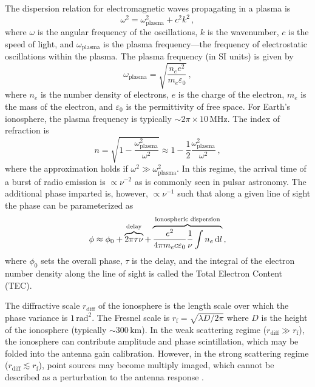 \begin{bibunit}
The dispersion relation for electromagnetic waves propagating in a plasma is
\begin{equation}
    \omega^2 = \omega_\text{plasma}^2 + c^2 k^2\,,
\end{equation}
where $\omega$ is the angular frequency of the oscillations, $k$ is the wavenumber, $c$ is the speed
of light, and $\omega_\text{plasma}$ is the plasma frequency---the frequency of electrostatic
oscillations within the plasma. The plasma frequency (in SI units) is given by
\begin{equation}
    \omega_\text{plasma} = \sqrt{\frac{n_e e^2}{m_e \varepsilon_0}}\,,
\end{equation}
where $n_e$ is the number density of electrons, $e$ is the charge of the electron, $m_e$ is the mass
of the electron, and $\varepsilon_0$ is the permittivity of free space.  For Earth's ionosphere, the
plasma frequency is typically $\sim 2\pi \times 10\,\text{MHz}$.  The index of refraction is
\begin{equation}
    n = \sqrt{1 - \frac{\omega_\text{plasma}^2}{\omega^2}}
      \approx 1 - \frac{1}{2}\frac{\omega_\text{plasma}^2}{\omega^2}\,,
\end{equation}
where the approximation holds if $\omega^2 \gg \omega_\text{plasma}^2$. In this regime, the arrival
time of a burst of radio emission is $\propto \nu^{-2}$ as is commonly seen in pulsar astronomy.
The additional phase imparted is, however, $\propto \nu^{-1}$ such that along a given line of sight
the phase can be parameterized as
\begin{equation}
    \phi \approx \phi_0 + \overbrace{2\pi\tau\nu}^\text{delay}
    + \overbrace{\frac{e^2}{4\pi m_e c \varepsilon_0}
        \frac{1}{\nu}\int n_e\,{\textrm d} l}^\text{ionospheric dispersion}\,,
\end{equation}
where $\phi_0$ sets the overall phase, $\tau$ is the delay, and the integral of the electron number
density along the line of sight is called the Total Electron Content (TEC).

The diffractive scale $r_\text{diff}$ of the ionosphere is the length scale over which the phase
variance is $1\,\text{rad}^2$. The Fresnel scale is $r_\text{f} = \sqrt{\lambda D / 2\pi}$ where $D$
is the height of the ionosphere (typically $\sim 300\,\text{km}$). In the weak scattering regime
($r_\text{diff} \gg r_\text{f}$), the ionosphere can contribute amplitude and phase scintillation,
which may be folded into the antenna gain calibration.  However, in the strong scattering regime
($r_\text{diff} \lesssim r_\text{f}$), point sources may become multiply imaged, which cannot be
described as a perturbation to the antenna response \citep{2015MNRAS.453..925V}.


\end{bibunit}
